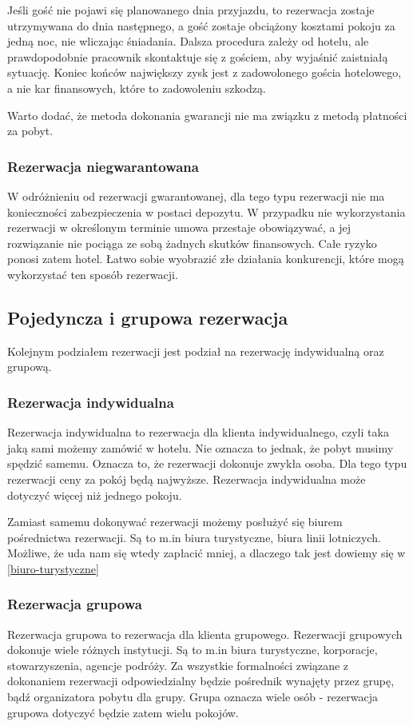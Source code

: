 \documentclass[a4paper,onecolumn,oneside,11pt,wide,floatssmall]{mwrep}
\theoremstyle{definition}
\theoremstyle{plain}%
\theoremstyle{remark}
\begin{document}
Jeśli gość nie pojawi się planowanego dnia przyjazdu, to rezerwacja zostaje 
utrzymywana do dnia następnego, a gość zostaje obciążony kosztami pokoju za 
jedną noc, nie wliczając śniadania. Dalsza procedura zależy od hotelu, ale 
prawdopodobnie pracownik skontaktuje się z gościem, aby wyjaśnić zaistniałą 
sytuację. Koniec końców największy zysk jest z zadowolonego gościa 
hotelowego, a nie kar finansowych, które to zadowoleniu szkodzą.

Warto dodać, że metoda dokonania gwarancji nie ma związku z metodą płatności 
za pobyt.

\subsubsection{Rezerwacja niegwarantowana}
W odróżnieniu od rezerwacji gwarantowanej, dla tego typu rezerwacji nie ma 
konieczności zabezpieczenia w postaci depozytu. W przypadku nie 
wykorzystania rezerwacji w określonym terminie umowa przestaje obowiązywać, 
a jej rozwiązanie nie pociąga ze sobą żadnych skutków finansowych. Całe 
ryzyko ponosi zatem hotel. Łatwo sobie wyobrazić złe działania konkurencji, 
które mogą wykorzystać ten sposób rezerwacji.

\subsection{Pojedyncza i grupowa rezerwacja}
Kolejnym podziałem rezerwacji jest podział na rezerwację indywidualną oraz 
grupową. 

\subsubsection{Rezerwacja indywidualna}
Rezerwacja indywidualna to rezerwacja dla klienta indywidualnego, czyli taka 
jaką sami możemy zamówić w hotelu. Nie oznacza to jednak, że pobyt musimy 
spędzić samemu. Oznacza to, że rezerwacji dokonuje zwykła osoba. Dla tego 
typu rezerwacji ceny za pokój będą najwyższe.
Rezerwacja indywidualna może dotyczyć więcej niż jednego pokoju.

Zamiast samemu dokonywać rezerwacji możemy posłużyć się biurem pośrednictwa 
rezerwacji. Są to m.in biura turystyczne, biura linii lotniczych. Możliwe, 
że uda nam się wtedy zapłacić mniej, a dlaczego tak jest dowiemy się w 
\ref{biuro-turystyczne}

\subsubsection{Rezerwacja grupowa}
\label{rezerwacja-grupowa}
Rezerwacja grupowa to rezerwacja dla klienta grupowego. Rezerwacji grupowych 
dokonuje wiele różnych instytucji. Są to m.in biura turystyczne, korporacje, 
stowarzyszenia, agencje podróży. Za wszystkie formalności związane z 
dokonaniem rezerwacji odpowiedzialny będzie pośrednik wynajęty przez grupę, 
bądź organizatora pobytu dla grupy. Grupa oznacza wiele osób - rezerwacja 
grupowa dotyczyć będzie zatem wielu pokojów. 
\end{document}
